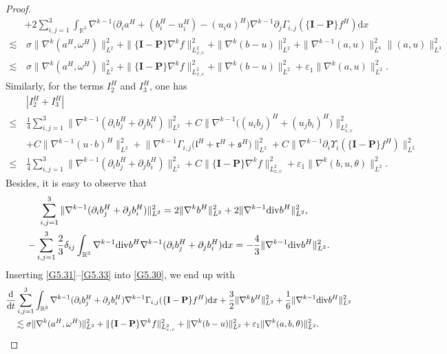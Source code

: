 \documentclass[reqno,11pt]{amsart}
\theoremstyle{plain}
\numberwithin{equation}{section}
\newcommand{\eps}{{\varepsilon}}
\begin{document}
\begin{proof}
\begin{align}
&+2\sum_{i, j=1}^3 \int_{\mathbb{R}^3} \nabla^{k-1}\big( \partial_i  {a}^H+({b}^H_i-{u}^H_i)-({u}_i a)^H\big)\nabla^{k-1}\partial_j\Gamma_{i, j}(\{\mathbf{I}-\mathbf{P}\} {f}^H) \mathrm{d} x\nonumber\\
\lesssim&\, \sigma\|\nabla^k({a}^H,\omega^H )\|_{L^2}^2+ \| \{\mathbf{I}-\mathbf{P}\} \nabla^k{f}\|_{L_{x,v}^2}^2+\|\nabla^k(b-u)\|_{L^2}^2+\|\nabla^{k-1} (a,u)\|_{L^6}^2 \|(a,u)\|_{L^3}^2\nonumber\\
\lesssim&\,\sigma \|\nabla^k({a}^H ,\omega^H )\|_{L^2}^2+ \| \{\mathbf{I}-\mathbf{P}\} \nabla^k{f}\|_{L_{x,v}^2}^2+\|\nabla^k(b-u)\|_{L^2}^2+\eps_1\|\nabla^{k} (a,u)\|_{L^2}^2. 
\end{align}
Similarly, for the terms $I_2^H$ and $I_3^H$,  one has %
\begin{align}\label{G5.32}
&|I_2^H+I_3^H|\nonumber\\  
\leq \,& \frac{1}{4} \sum_{i, j=1}^3 \|\nabla^{k-1} (\partial_i b_j^H+\partial_j b_i^H ) \|_{L^2}^2+C     \|\nabla^{k-1} \big((u_i b_j)^H+(u_j b_i)^H \big) \|_{L_{x,v}^2}^2 \nonumber\\
&  +C \|\nabla^{k-1}(u \cdot b)^H \|_{L^2}^2+ \big\|\nabla^{k-1} \Gamma_{i, j}\big(\mathfrak{l}^H+\mathfrak{r}^H+\mathfrak{s}^H\big) \big\|_{L ^2}^2+C\|\nabla^{k-1} \partial_i \Upsilon_i(\{\mathbf{I}-\mathbf{P}\} f^H) \|_{L ^2}^2  \nonumber\\
\leq\,& \frac{1}{4} \sum_{i, j=1}^3\|\nabla^{k-1} (\partial_i b_j^H+\partial_j b_i^H ) \|_{L^2}^2+C\|\{\mathbf{I}-\mathbf{P}\} \nabla^k f\|_{L_{x,v}^2  }^2+\eps_1\|\nabla^k (b,u,\theta)\|_{L^2}^2. 
\end{align}
Besides, it is easy to observe that
\begin{gather} 
 \sum_{i, j=1}^3 \|\nabla^{k-1}(\partial_i  {b}^H _j+\partial_j  {b}^H _i) \|_{L^2}^2 =2 \|\nabla^{k}   {b}^H \|_{L^2}^2+2 \| \nabla^{k-1}{\rm div}  {b}^H \|_{L^2}^2,   \quad \label{G5.33-1}\\
-\sum_{i, j=1}^3 \frac{2}{3} \delta_{i j} \int_{\mathbb{R}^3}   \nabla^{k-1}{\rm div}    {b}^H   \nabla^{k-1} (\partial_i  {b}^H _j+\partial_j  {b}^H _i ) \mathrm{d} x 
=-\frac{4}{3} \|  \nabla^{k-1}{\rm div}    {b}^H  \|_{L^2}^2.\label{G5.33}
\end{gather}   
Inserting \eqref{G5.31}--\eqref{G5.33} into \eqref{G5.30}, we end up with
\begin{align}\label{G5.34}
& \frac{\mathrm{d}}{\mathrm{d} t}  \sum_{i, j=1}^3 \int_{\mathbb{R}^3}  \nabla^{k-1} (\partial_i b^H_j+\partial_j b^H_i )  \nabla^{k-1} \Gamma_{i, j}(\{\mathbf{I}-\mathbf{P}\} f^H) \mathrm{d} x  +  \frac{3}{2} \|\nabla^k b^H\|_{L^2}^2+\frac{1}{6} \|   \nabla^{k-1}{\rm div}b^H \|_{L^2}^2  \nonumber\\
&\quad \lesssim \sigma \|\nabla^k(a^H, \omega^H)\|_{L^2}^2+\| \{\mathbf{I}-\mathbf{P}\} \nabla^k{f}\|_{L_{x,v}^2}^2+\|\nabla^k(b-u)\|_{L^2}^2+\eps_1\|\nabla^{k} (a,b,\theta)\|_{L^2}^2. 
\end{align}


\end{proof}
\end{document}
